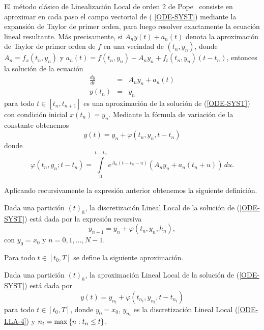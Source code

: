 El método clásico de Linealización Local de orden 2 de Pope~\cite{pope1963exponential}
 consiste en aproximar en cada paso el campo vectorial de (%
\ref{ODE-SYST}) mediante la expansión de Taylor de primer orden, para
luego resolver exactamente la ecuación lineal resultante. Más
precisamente, si $A_{n}y(t)+a_{n}(t)$ denota la aproximación de Taylor
de primer orden de $f$ en una vecindad de $(t_n,y_{n})$, donde \mbox{$
	A_{n}=f_{x}(t_n,y_{n})$} y $a_{n}(t)=f(t_n,y_{n})-A_{n}y_{n}+f_t(t_n,y_n)(t-t_n)$, entonces la
solución de la ecuación 
\begin{eqnarray*}
\frac{dy}{dt} & = & A_{n}y_n+a_{n}(t) \\ %
y(t_{n})& = & y_{n}  \nonumber
\end{eqnarray*}
para todo $t\in[t_{n},t_{n+1}]$ es una aproximación de la solución
de (\ref{ODE-SYST}) con condición inicial \mbox{$x(t_{n})=y_{n}$}. Mediante la fórmula de variación de la constante obtenemos 
\begin{equation}
y(t)=y_{n}+\varphi(t_{n},y_{n},t-t_{n})  \label{ODE-SYST-FORM-LL}
\end{equation}
donde 
\begin{equation*}
\varphi(t_{n},y_{n};t-t_{n})=\int\limits^{t-t_{n}}_{0} e^{{A_{n}(t-t_{n}-u)}}
(A_{n}y_{n}+a_{n}(t_{n}+u))\,du.  %
\end{equation*}

Aplicando recursivamente la expresión anterior obtenemos la siguiente
definición.

\begin{definition}
	\label{definition LLD} Dada una partición $(t)_{h}$, la discretización Lineal Local de la solución de (\ref{ODE-SYST}) está dada por la expresión recursiva
	\begin{equation}
	y_{n+1}=y_{n}+\varphi \left( t_{n},y_{n},h_{n}\right) ,  \label{ODE-LLA-4}
	\end{equation}%
	con $y_{0}=x_{0}$ y $n=0,1,\ldots,N-1$.
\end{definition}

Para todo $t\in[t_{0},T]$ se define la siguiente aproximación.
\begin{definition}
	\label{definition LLA} Dada una partición $(t)_{h}$, la aproximación
	Lineal Local de la solución de (\ref{ODE-SYST}) está dada por 
	\begin{equation}
	y(t)=y_{n_{t}}+\varphi(t_{n_{t}},y_{n_{t}},t-t_{n_{t}})
	\label{ODE-REV-FORM-LLA}
	\end{equation}
	para todo $t\in[t_{0},T]$, donde $y_{0}=x_{0}$, $y_{n_{t}}$ es la discretización Lineal Local (\ref{ODE-LLA-4}) y ${n_{t}=\max\left\{ n:t_{n}\leq t \right\}}$.
\end{definition}


